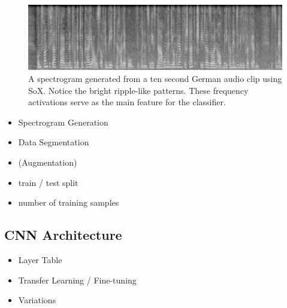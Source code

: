	
	\begin{figure}[h]
  		\centering
    	\includegraphics[width=\textwidth,keepaspectratio]{img/spectrogram.png}
    	\caption{A spectrogram generated from a ten second German audio clip  using SoX. Notice the bright ripple-like patterns. These frequency activations serve as the main feature for the classifier.}
    	\label{fig:spectrogram}
	\end{figure}
	
    \begin{itemize}
        \item Spectrogram Generation
        \item Data Segmentation
        \item (Augmentation)
        \item train / test split
		\item number of training samples
    \end{itemize}

\subsection{CNN Architecture}


    \begin{itemize}
        \item Layer Table
        \item Transfer Learning / Fine-tuning
        \item Variations
    \end{itemize}
    
